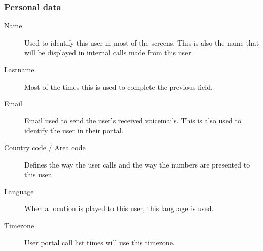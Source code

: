 \documentclass[letterpaper,10pt,english]{sphinxmanual}
\begin{document}
\subsubsection{Personal data}
\label{administration_portal/client/vpbx/users:personal-data}\begin{description}
\item[{Name}] \leavevmode{}\label{administration_portal/client/vpbx/users:term-name}
Used to identify this user in most of the screens. This is also the
name that will be displayed in internal calls made from this user.

\item[{Lastname}] \leavevmode{}\label{administration_portal/client/vpbx/users:term-lastname}
Most of the times this is used to complete the previous field.

\item[{Email}] \leavevmode{}\label{administration_portal/client/vpbx/users:term-email}
Email used to send the user's received voicemails. This is also used to
identify the user in their portal.

\item[{Country code / Area code}] \leavevmode{}\label{administration_portal/client/vpbx/users:term-country-code-area-code}
Defines the way the user calls and the way the numbers are presented to
this user.

\item[{Language}] \leavevmode{}\label{administration_portal/client/vpbx/users:term-language}
When a locution is played to this user, this language is used.

\item[{Timezone}] \leavevmode{}\label{administration_portal/client/vpbx/users:term-timezone}
User portal call list times will use this timezone.

\end{description}
\end{document}
